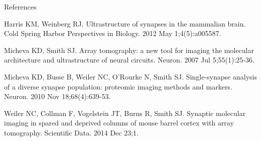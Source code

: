 \documentclass[final, table]{beamer}
\newlength{\onecolwid}
\begin{document}
\begin{frame}[t]
\begin{columns}[t]
\begin{column}{\onecolwid}
\begin{block}{References}
{\begin{thebibliography}{99}
Harris KM, Weinberg RJ. Ultrastructure of synapses in the mammalian brain. Cold Spring Harbor Perspectives in Biology. 2012 May 1;4(5):a005587.

Micheva KD, Smith SJ. Array tomography: a new tool for imaging the molecular architecture and ultrastructure of neural circuits. Neuron. 2007 Jul 5;55(1):25-36.

Micheva KD, Busse B, Weiler NC, O'Rourke N, Smith SJ. Single-synapse analysis of a diverse synapse population: proteomic imaging methods and markers. Neuron. 2010 Nov 18;68(4):639-53.


Weiler NC, Collman F, Vogelstein JT, Burns R, Smith SJ. Synaptic molecular imaging in spared and deprived columns of mouse barrel cortex with array tomography. Scientific Data. 2014 Dec 23;1.

\end{thebibliography}}
\end{block}

\end{column}


\end{columns}
\end{frame}
\end{document}
